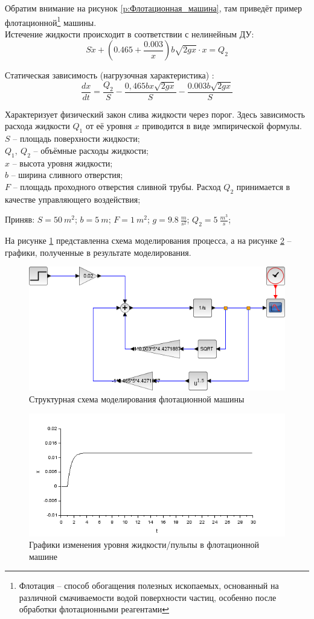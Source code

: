 \documentclass[a4paper, 12pt]{article}
\begin{document}
Обратим внимание на рисунок \ref{p:Флотационная_машина}, там приведёт пример флотационной\footnote{ Флотация – способ обогащения полезных ископаемых, основанный на различной смачиваемости водой поверхности частиц, особенно после обработки флотационными реагентами} машины. \\

Истечение жидкости происходит в соответствии с нелинейным ДУ:
\[ S\dot{x}+\left(0.465+\frac{0.003}{x}\right)b\sqrt{2gx}\cdot x = Q_2 \]

Статическая зависимость (нагрузочная характеристика) :
\[ \frac{dx}{dt}=\frac{Q_2}{S}-\frac{0,465bx\sqrt{2gx}}{S}-\frac{0.003b\sqrt{2gx}}{S} \]

Характеризует физический закон слива жидкости через порог. Здесь зависимость расхода жидкости $Q_1$ от её уровня $x$ приводится в виде эмпирической формулы. \\
$S$ -- площадь поверхности жидкости; \\
$Q_1,\ Q_2$  – объёмные расходы жидкости; \\ 
$x$ -- высота уровня жидкости; \\
$b$ -- ширина сливного отверстия; \\
$F$ -- площадь проходного отверстия сливной трубы. Расход $Q_2$ принимается в качестве управляющего воздействия;

Приняв:
$S = 50 \ m^2$; 
$b = 5 \ m $;  
$F = 1 \ m^2$;  
$g = 9.8 \ \frac{m}{s^2}$; 
$Q_2 = 5 \ \frac{m^3}{s}$; 

На рисунке \ref{p:Флотационная_машина_схема} представленна схема моделирования процесса, а на рисунке \ref{p:Флотационная_машина_графики} -- графики, полученные в результате моделирования.

\begin{figure}[h!]
	\centering
	\includegraphics[scale=0.8]{scheme4}
	\caption{Структурная схема моделирования флотационной машины}
	\label{p:Флотационная_машина_схема}
\end{figure}


\begin{figure}[h!]
	\centering
	\includegraphics[scale=0.8]{graph4-1}
	\caption{Графики изменения уровня жидкости/пульпы в флотационной машине }
	\label{p:Флотационная_машина_графики}
\end{figure}
\end{document}
